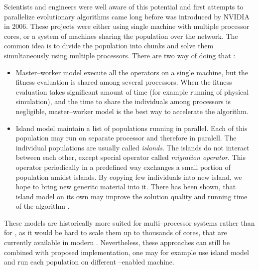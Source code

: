 Scientists and engineers were well aware of this potential and first attempts to parallelize evolutionary algorithms came long before \cuda was introduced by NVIDIA \citep{PGAPack} in 2006. These projects were either using single machine with multiple processor cores, or a system of machines sharing the population over the network. The common idea is to divide the population into chunks and solve them simultaneously using multiple processors. There are two way of doing that \citep{CHENG2019514}:
\begin{itemize}
    \item Master--worker model execute all the operators on a single machine, but the fitness evaluation is shared among several processors. When the fitness evaluation takes significant amount of time (for example running of physical simulation), and the time to share the individuals among processors is negligible, master--worker model is the best way to accelerate the algorithm.
    \item Island model maintain a list of populations running in parallel. Each of this population may run on separate processor and therefore in paralell. The individual populations are usually called \emph{islands}. The islands do not interact between each other, except special operator called \emph{migration operator}. This operator periodically in a predefined way exchanges a small portion of population amidst islands. By copying few individuals into new island, we hope to bring new generitc material into it. There has been shown, that island model on its own may improve the solution quality and running time of the algorithm \citep{IslandModel}.
\end{itemize}
These models are historically more suited for multi--processor systems rather than for \gpuns, as it would be hard to scale them up to thousands of cores, that are currently available in modern \gpuns. Nevertheless, these approaches can still be combined with proposed implementation, one may for example use island model and run each population on different \gpuns--enabled machine.

